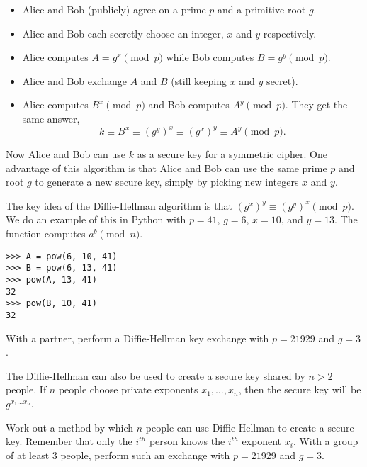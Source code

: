 \begin{itemize}[$\bullet$]

\item Alice and Bob (publicly) agree on a prime $p$ and a primitive root $g$.

\item Alice and Bob each secretly choose an integer, $x$ and $y$ respectively.

\item Alice computes $A = g^x \pmod{p}$ while Bob computes $B = g^y \pmod{p}$.

\item Alice and Bob exchange $A$ and $B$ (still keeping $x$ and $y$ secret).

\item Alice computes $B^x \pmod{p}$ and Bob computes $A^y \pmod{p}$. They get the same answer, 
\[k \equiv B^x \equiv (g^y)^x \equiv (g^x)^y \equiv A^y \pmod{p}.\] 

\end{itemize}
Now Alice and Bob can use $k$ as a secure key for a symmetric cipher. 
One advantage of this algorithm is that Alice and Bob can use the same prime $p$ and root $g$ to generate a new secure key, simply by picking new integers $x$ and $y$.

The key idea of the Diffie-Hellman algorithm is that $(g^x)^y\equiv (g^y)^x \pmod{p}$. 
We do an example of this in Python with $p=41$, $g=6$, $x=10$, and $y=13$.
The function  computes $a^b \pmod{n}$.
\begin{lstlisting}
>>> A = pow(6, 10, 41)
>>> B = pow(6, 13, 41)
>>> pow(A, 13, 41)
32
>>> pow(B, 10, 41)
32
\end{lstlisting}

\begin{problem}
With a partner, perform a Diffie-Hellman key exchange with $p = 21929$ and $g=3$.
\end{problem}

The Diffie-Hellman can also be used to create a secure key shared by $n>2$ people. 
If $n$ people choose private exponents $x_1, \ldots, x_n$, then the secure key will be $g^{x_1 \ldots x_n}$.

\begin{problem}
Work out a method by which $n$ people can use Diffie-Hellman to create a secure key.
Remember that only the $i^{th}$ person knows the $i^{th}$ exponent $x_i$.
With a group of at least 3 people, perform such an exchange with $p = 21929$ and $g=3$.
\end{problem}

